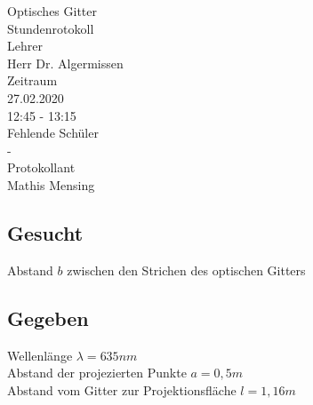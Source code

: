 \documentclass[12pt, a4paper]{article}
\begin{document}
\begin{titlepage}
    \begin{center}
        \LARGE{Optisches Gitter} \\
        \large{Stundenrotokoll} \\
        \vspace{10mm}
        \small{Lehrer} \\
        \large{Herr Dr. Algermissen} \\
        \vspace{10mm}
        \small{Zeitraum} \\
        \large{ 27.02.2020 \\
                12:45 - 13:15 }\\
        \vspace{10mm}
        \small{Fehlende Sch\"uler}\\
        \large{-}\\
        \vspace{10mm}
        \small{Protokollant}\\
        \large{Mathis Mensing}
    \end{center}
\end{titlepage}

\thispagestyle{empty}
\newpage
\subsection*{Gesucht}
Abstand $b$ zwischen den Strichen des optischen Gitters

\subsection*{Gegeben}
Wellenlänge $\lambda=635nm$\\
Abstand der projezierten Punkte $a=0,5m$\\
Abstand vom Gitter zur Projektionsfl\"ache $l=1,16m$
\end{document}
